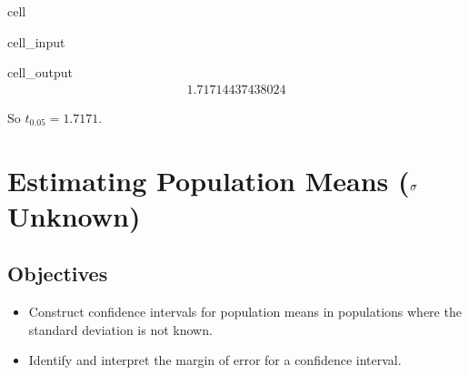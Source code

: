 \documentclass[letterpaper,10pt,english]{jupyterBook}
\begin{document}
\begin{sphinxuseclass}{cell}\begin{sphinxVerbatimInput}

\begin{sphinxuseclass}{cell_input}
\begin{sphinxVerbatim}[commandchars=\\\{\}]
\end{sphinxVerbatim}

\end{sphinxuseclass}\end{sphinxVerbatimInput}
\begin{sphinxVerbatimOutput}

\begin{sphinxuseclass}{cell_output}\begin{equation*}
\begin{split}1.71714437438024\end{split}
\end{equation*}
\end{sphinxuseclass}\end{sphinxVerbatimOutput}

\end{sphinxuseclass}
\sphinxAtStartPar
So \(t_{0.05} = 1.7171\).

\sphinxstepscope


\section{Estimating Population Means (\protect\(\sigma\protect\) Unknown)}
\label{\detokenize{Ch5 Confidence Intervals/5.4 Estimating Population Means (Sigma Unknown):estimating-population-means-sigma-unknown}}\label{\detokenize{Ch5 Confidence Intervals/5.4 Estimating Population Means (Sigma Unknown)::doc}}

\subsection{Objectives}
\label{\detokenize{Ch5 Confidence Intervals/5.4 Estimating Population Means (Sigma Unknown):objectives}}\begin{itemize}
\item {} 
\sphinxAtStartPar
Construct confidence intervals for population means in populations where the standard deviation is not known.

\item {} 
\sphinxAtStartPar
Identify and interpret the margin of error for a confidence interval.

\end{itemize}
\end{document}
